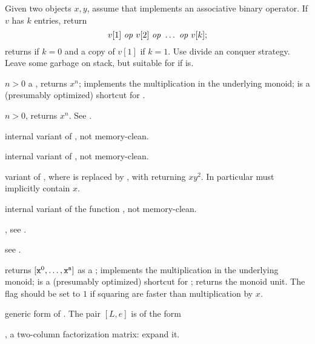 Given two objects $x,y$, assume that  implements an
associative binary operator. If $v$ has $k$ entries, return
$$v[1]~\hbox{\it op\/}~v[2]~\hbox{\it op\/}~\ldots ~\hbox{\it op\/}~v[k];$$
returns  if $k = 0$ and a copy of $v[1]$ if $k = 1$.
Use divide an conquer strategy. Leave some garbage on stack, but suitable for
 if  is.

 $n > 0$ a
, returns $x^n$;  implements the multiplication
in the underlying monoid;  is a (presumably optimized) shortcut for
.

 $n > 0$,
returns $x^n$. See .

internal variant of , not memory-clean.

internal variant of , not memory-clean.

 variant
of , where  is replaced by , with
 returning $xy^2$. In particular  must implicitly
contain $x$.

internal variant of the function , not memory-clean.

, see
.

see .

returns $[{\tt x}^0, \dots, {\tt x}^{\tt n}]$ as a ;  implements the multiplication in the underlying monoid; 
is a (presumably optimized) shortcut for ; 
returns the monoid unit. The flag  should be set to $1$ if
squaring are faster than multiplication by $x$.

 generic form
of . The pair $[L,e]$ is of the form

\item \kbd{[fa, NULL]},  a two-column factorization matrix: expand it.

